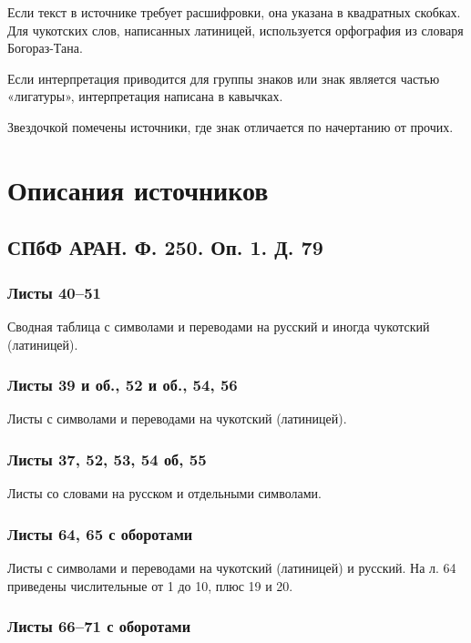 \documentclass{article}
\begin{document}
Если текст в источнике требует расшифровки, она указана в квадратных скобках. Для чукотских слов, написанных латиницей, используется орфография из словаря Богораз-Тана\cite{bogoraz1937}.

Если интерпретация приводится для группы знаков или знак является частью «лигатуры», интерпретация написана в кавычках.

Звездочкой помечены источники, где знак отличается по начертанию от прочих.

\section{Описания источников} 

\subsection{СПбФ АРАН. Ф. 250. Оп. 1. Д. 79}

\subsubsection{Листы 40–51}

Сводная таблица с символами и переводами на русский и иногда чукотский (латиницей).

\subsubsection{Листы 39 и об., 52 и об., 54, 56}

Листы с символами и переводами на чукотский (латиницей).

\subsubsection{Листы 37, 52, 53, 54 об, 55}

Листы со словами на русском и отдельными символами.

\subsubsection{Листы 64, 65 с оборотами}

Листы с символами и переводами на чукотский (латиницей) и русский. На л. 64 приведены числительные от 1 до 10, плюс 19 и 20.

\subsubsection{Листы 66–71 с оборотами}
\end{document}
